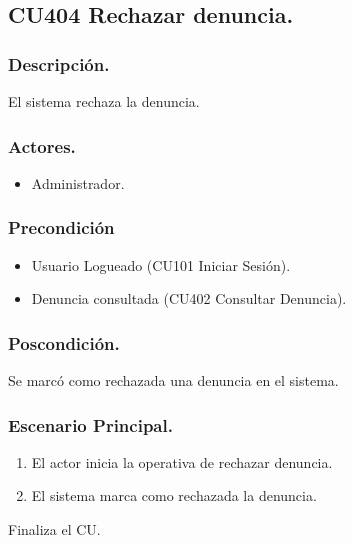 \subsection{CU404 Rechazar denuncia.}
\subsubsection{Descripci\'{o}n.}
El sistema rechaza la denuncia.
\subsubsection{Actores.}
\begin{itemize}
\item Administrador.
\end{itemize}
\subsubsection{Precondici\'{o}n}
\begin{itemize}
\item Usuario Logueado (CU101 Iniciar Sesi\'{o}n).
\item Denuncia consultada (CU402 Consultar Denuncia).
\end{itemize}
\subsubsection{Poscondici\'{o}n.}
Se marc\'{o} como rechazada una denuncia en el sistema.
\subsubsection{Escenario Principal.}
\begin{enumerate}
\item El actor inicia la operativa de rechazar denuncia.
\item El sistema marca como rechazada la denuncia.
\end{enumerate}
Finaliza el CU.

\clearpage\null\newpage